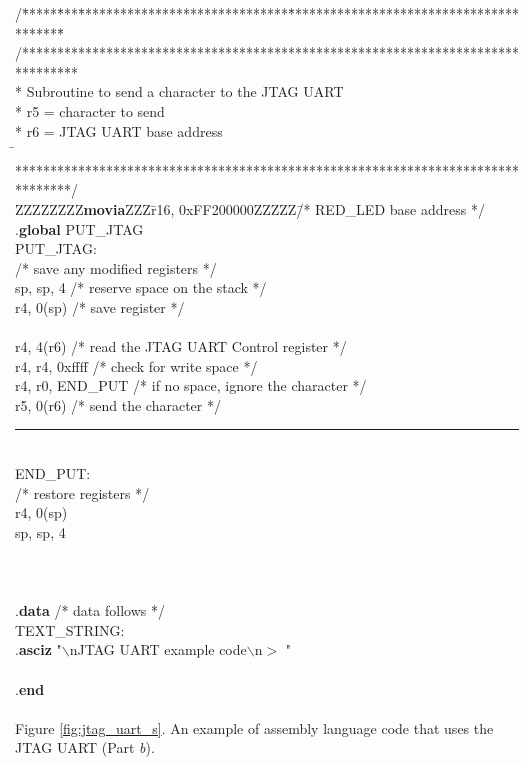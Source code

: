 \begin{center}
\begin{minipage}[t]{12.5 cm}
\begin{tabbing}
/\=*****\=***\=******************************\=****************************************\=\kill
/********************************************************************************\\
\>* Subroutine to send a character to the JTAG UART\\
\>* \>r5 \>= character to send\\
\>* \>r6 \>= JTAG UART base address\\
\=\kill
\>********************************************************************************/\\
ZZZZZZZZ\={\bf movia}ZZZ\=r16, 0xFF200000ZZZZZ\=/* RED\_LED base address */\kill
\>.{\bf global} \>PUT\_JTAG\\
PUT\_JTAG:\\
\>/* save any modified registers */\\
 \>sp, sp, 4 \>/* reserve space on the stack */\\
 \>r4, 0(sp) \>/* save register */\\
\\
 \>r4, 4(r6) \>/* read the JTAG UART Control register */\\
 \>r4, r4, 0xffff \>/* check for write space */\\
 \>r4, r0, END\_PUT \>/* if no space, ignore the character */\\
 \>r5, 0(r6) \>/* send the character */\\
\rule{6.0in}{0in}~\\
END\_PUT:\\
\>/* restore registers */\\
 \>r4, 0(sp)\\
 \>sp, sp, 4\\
\\
\\
\\
\>.{\bf data} \>\>/* data follows */\\
TEXT\_STRING:\\
\>.{\bf asciz} "$\backslash$nJTAG UART example code$\backslash$n$>$ "\\
\\
\>.{\bf end}\\
~\\
Figure \ref{fig:jtag_uart_s}. An example of assembly language code that uses the JTAG
UART (Part {\it b}).
\end{tabbing}
\end{minipage}
\end{center}
